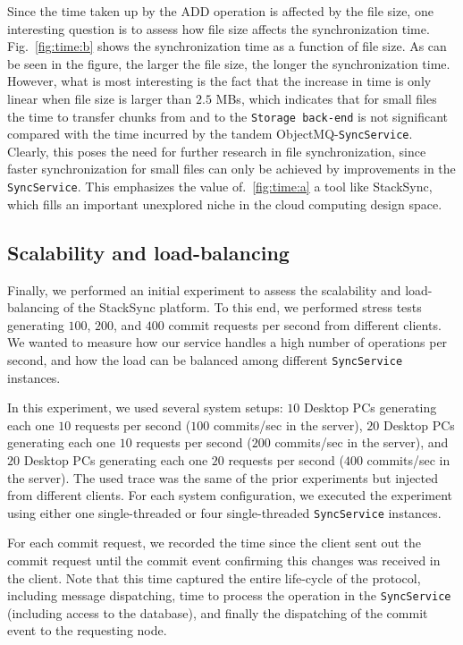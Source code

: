 Since the time taken up by the ADD operation is affected by the file size, one interesting question
is to assess how file size affects the synchronization time. Fig.~\ref{fig:time:b} shows the synchronization
time as a function of file size. As can be seen in the figure, the larger the file size, the longer
the synchronization time. However, what is most interesting is the fact that the increase in time
is only linear when file size is larger than $2.5$ MBs, which indicates that for small files the
time to transfer chunks from and to the \texttt{Storage back-end} is not significant compared
with the time incurred by the tandem ObjectMQ-\texttt{SyncService}. Clearly, this poses the need for further research in file synchronization, since faster synchronization for small files can only be achieved by improvements in the \texttt{SyncService}.
This emphasizes the value of.~\ref{fig:time:a} a tool like StackSync, which fills an important unexplored niche in the cloud computing design space.   

\subsection{Scalability and load-balancing}

Finally, we performed an initial experiment to assess the scalability and load-balancing of 
the StackSync platform. To this end, we performed stress tests generating $100$, $200$, and
$400$ commit requests per second from different clients. We wanted to measure how our service
handles a high number of operations per second, and how the load can be balanced among different
\texttt{SyncService} instances.

In this experiment, we used several system setups: $10$ Desktop PCs generating each one $10$ 
requests per second ($100$ commits/sec in the server), $20$ Desktop PCs generating each one
$10$ requests per second ($200$ commits/sec in the server), and $20$ Desktop PCs generating
each one $20$ requests per second ($400$ commits/sec in the server). 
The used trace was the same of the prior experiments but injected from different clients.
For each system configuration, we executed the experiment using either one single-threaded or four single-threaded 
\texttt{SyncService} instances. 

For each commit request, we recorded the time since the client sent out the commit request until the commit event 
confirming this changes was received in the client. Note that this time captured the entire life-cycle of the protocol,
including message dispatching, time to process the operation in the \texttt{SyncService}
(including access to the database), and finally the dispatching of the commit event to the requesting node.

